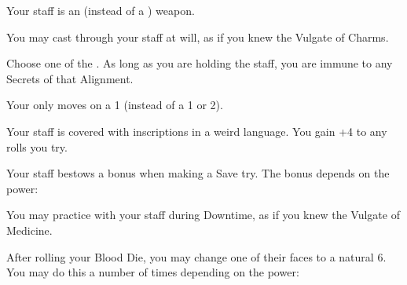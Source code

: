 \cbreak


Your staff is an \INT (instead of a \DEX) weapon.


You may cast  through your staff at will, as if you knew the Vulgate of Charms.


Choose one of the . As long as you are holding the staff, you are immune to any Secrets of that Alignment.


Your \INGENUITY only moves \DCDOWN on a 1 (instead of a 1 or 2).


Your staff is covered with inscriptions in a weird language.  You gain +4 to any  rolls you try.


Your staff bestows a bonus when making a Save try. The bonus depends on the power:



You may practice  with your staff during Downtime, as if you knew the Vulgate of Medicine.

\newpage


After rolling your Blood Die, you may change one of their faces to a natural 6. You may do this a number of times depending on the power:



